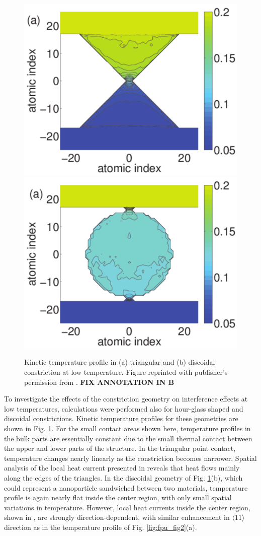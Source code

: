 \begin{figure}
\begin{center}
 \includegraphics[width=.49\columnwidth]{pics/aip_fig5a.pdf}
 \includegraphics[width=.49\columnwidth]{pics/aip_fig6a.pdf}
 \caption{Kinetic temperature profile in (a) triangular and (b) discoidal constriction at low temperature. Figure reprinted with publisher's permission from . \textbf{FIX ANNOTATION IN B}}
\label{fig:aip_figs56}
\end{center}
\end{figure}

To investigate the effects of the constriction geometry on interference effects at low temperatures, calculations were performed also for hour-glass shaped and discoidal constrictions. Kinetic temperature profiles for these geometries are shown in Fig. \ref{fig:aip_figs56}. For the small contact areas shown here, temperature profiles in the bulk parts are essentially constant due to the small thermal contact between the upper and lower parts of the structure. In the triangular point contact, temperature changes nearly linearly as the constriction becomes narrower. Spatial analysis of the local heat current presented in  reveals that heat flows mainly along the edges of the triangles. In the discoidal geometry of Fig. \ref{fig:aip_figs56}(b), which could represent a nanoparticle sandwiched between two materials, temperature profile is again nearly flat inside the center region, with only small spatial variations in temperature. However, local heat currents inside the center region, shown in , are strongly direction-dependent, with similar enhancement in $\langle 11\rangle$ direction as in the temperature profile of Fig. \ref{fig:fpu_fig2}(a).

